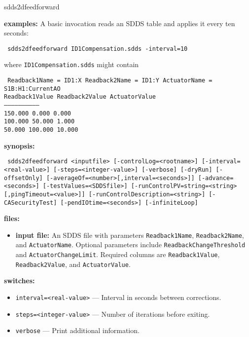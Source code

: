 \begin{sddsprog}{sdds2dfeedforward}
\item \textbf{examples:}
A basic invocation reads an SDDS table and applies it every ten seconds:
\begin{flushleft}{\tt
sdds2dfeedforward ID1Compensation.sdds -interval=10
}\end{flushleft}
where \verb+ID1Compensation.sdds+ might contain
\begin{flushleft}{\tt
Readback1Name = ID1:X \quad Readback2Name = ID1:Y \quad ActuatorName = S1B:H1:CurrentAO\\
 Readback1Value  Readback2Value  ActuatorValue\\
------------------------------\\
       150.000       0.000          0.000\\
       100.000      50.000          1.000\\
        50.000     100.000         10.000\\
}\end{flushleft}
\item \textbf{synopsis:}
\begin{flushleft}{\tt
sdds2dfeedforward <inputfile>\
       [-controlLog=<rootname>]\
       [-interval=<real-value>] [-steps=<integer-value>]\
       [-verbose] [-dryRun] [-offsetOnly]\
       [-averageOf=<number>[,interval=<seconds>]]\
       [-advance=<seconds>]\
       [-testValues=<SDDSfile>]\
       [-runControlPV=string=<string>[,pingTimeout=<value>]]\
       [-runControlDescription=<string>]\
       [-CASecurityTest]\
       [-pendIOtime=<seconds>] [-infiniteLoop]
}\end{flushleft}
\item \textbf{files:}
\begin{itemize}
  \item \textbf{input file:} An SDDS file with parameters \verb+Readback1Name+,
  \verb+Readback2Name+, and \verb+ActuatorName+.  Optional parameters include
  \verb+ReadbackChangeThreshold+ and \verb+ActuatorChangeLimit+.  Required
  columns are \verb+Readback1Value+, \verb+Readback2Value+, and
  \verb+ActuatorValue+.
\end{itemize}
\item \textbf{switches:}
\begin{itemize}
  \item {\tt interval=<real-value>} --- Interval in seconds between corrections.
  \item {\tt steps=<integer-value>} --- Number of iterations before exiting.
  \item {\tt verbose} --- Print additional information.

\end{itemize}
\end{sddsprog}
